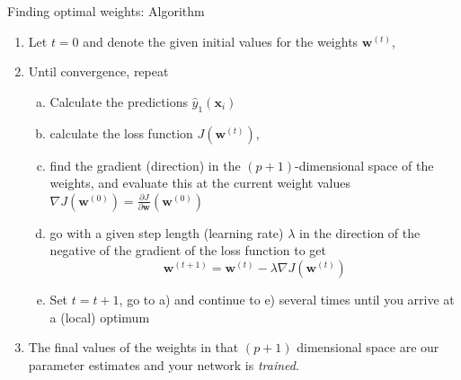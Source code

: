 \documentclass[10pt,ignorenonframetext,]{beamer}
\providecommand{\tightlist}{%
  \setlength{\itemsep}{0pt}\setlength{\parskip}{0pt}}
\begin{document}
\begin{frame}

\begin{block}{Finding optimal weights: Algorithm}

\vspace{2mm}

\begin{enumerate}
\tightlist
\item
  Let \(t=0\) and denote the given initial values for the weights
  \({\boldsymbol w}^{(t)}\), \vspace{2mm}
\item
  Until convergence, repeat

  \begin{enumerate}
  [a)]
  \tightlist
  \item
    Calculate the predictions \({\hat{y}_1({\boldsymbol x}_i)}\)
  \item
    calculate the loss function \(J({\boldsymbol w}^{(t)})\),
  \item
    find the gradient (direction) in the \((p+1)\)-dimensional space of
    the weights, and evaluate this at the current weight values
    \(\nabla J({\boldsymbol w}^{(0)})={\frac{\partial J}{\partial {\boldsymbol w}}}({\boldsymbol w}^{(0)})\)
  \item
    go with a given step length (learning rate) \(\lambda\) in the
    direction of the negative of the gradient of the loss function to
    get
    \[{\boldsymbol w}^{(t+1)}={\boldsymbol w}^{(t)} - \lambda \nabla J({\boldsymbol w}^{(t)})\]
  \item
    Set \(t=t+1\), go to a) and continue to e) several times until you
    arrive at a (local) optimum \vspace{2mm}
  \end{enumerate}
\item
  The final values of the weights in that \((p+1)\) dimensional space
  are our parameter estimates and your network is \emph{trained}.
\end{enumerate}

\end{block}

\end{frame}
\end{document}
